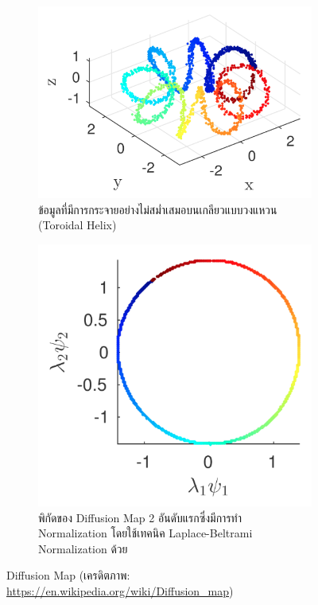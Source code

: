 \begin{figure}[H]
    \centering
    \begin{subfigure}{0.5\textwidth}
        \centering
        \includegraphics[width=0.7\linewidth]{fig/diff_map-1.png}
        \caption{ข้อมูลที่มีการกระจายอย่างไม่สม่ำเสมอบนเกลียวแบบวงแหวน (Toroidal Helix)}
        \label{fig:diff_map_1}
    \end{subfigure}%
    \begin{subfigure}{0.5\textwidth}
        \centering
        \includegraphics[width=0.7\linewidth]{fig/diff_map-2.png}
        \caption{พิกัดของ Diffusion Map 2 อันดับแรกซึ่งมีการทำ Normalization โดยใช้เทคนิค Laplace-Beltrami Normalization ด้วย}
        \label{fig:diff_map_2}
    \end{subfigure}
    \caption{Diffusion Map (เครดิตภาพ: \url{https://en.wikipedia.org/wiki/Diffusion_map})}
\end{figure}

